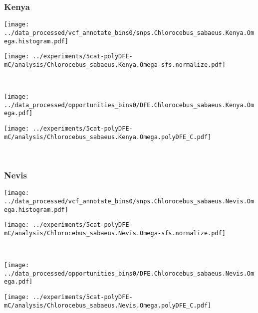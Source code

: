 \subsubsection{Kenya}

\begin{minipage}{0.49\linewidth}
    \texttt{[image: ../data\_processed/vcf\_annotate\_bins0/snps.Chlorocebus\_sabaeus.Kenya.Omega.histogram.pdf]}
\end{minipage}
\begin{minipage}{0.49\linewidth}
    \texttt{[image: ../experiments/5cat-polyDFE-mC/analysis/Chlorocebus\_sabaeus.Kenya.Omega-sfs.normalize.pdf]}
\end{minipage}
\\
\begin{minipage}{0.49\linewidth}
    \texttt{[image: ../data\_processed/opportunities\_bins0/DFE.Chlorocebus\_sabaeus.Kenya.Omega.pdf]}
\end{minipage}
\begin{minipage}{0.49\linewidth}
    \texttt{[image: ../experiments/5cat-polyDFE-mC/analysis/Chlorocebus\_sabaeus.Kenya.Omega.polyDFE\_C.pdf]}
\end{minipage}
\\

\subsubsection{Nevis}

\begin{minipage}{0.49\linewidth}
    \texttt{[image: ../data\_processed/vcf\_annotate\_bins0/snps.Chlorocebus\_sabaeus.Nevis.Omega.histogram.pdf]}
\end{minipage}
\begin{minipage}{0.49\linewidth}
    \texttt{[image: ../experiments/5cat-polyDFE-mC/analysis/Chlorocebus\_sabaeus.Nevis.Omega-sfs.normalize.pdf]}
\end{minipage}
\\
\begin{minipage}{0.49\linewidth}
    \texttt{[image: ../data\_processed/opportunities\_bins0/DFE.Chlorocebus\_sabaeus.Nevis.Omega.pdf]}
\end{minipage}
\begin{minipage}{0.49\linewidth}
    \texttt{[image: ../experiments/5cat-polyDFE-mC/analysis/Chlorocebus\_sabaeus.Nevis.Omega.polyDFE\_C.pdf]}
\end{minipage}
\\


